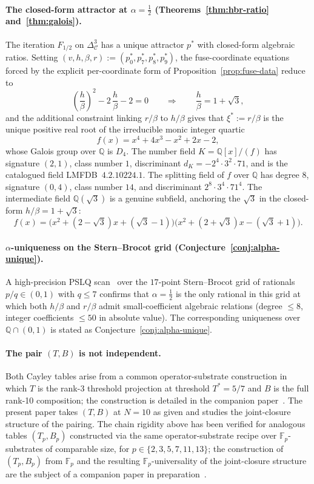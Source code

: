 \documentclass[11pt,reqno]{amsart}
\theoremstyle{plain}
\theoremstyle{definition}
\theoremstyle{remark}
\newcommand{\Q}{\mathbb{Q}}
\newcommand{\F}{\mathbb{F}}
\newcommand{\Cfour}{\mathcal{C}}
\begin{document}
\paragraph{The closed-form attractor at $\alpha = \tfrac{1}{2}$
(Theorems~\ref{thm:hbr-ratio} and~\ref{thm:galois}).}
The iteration $F_{1/2}$ on $\Delta^{3}_{\Cfour}$ has a unique
attractor $p^*$ with closed-form algebraic ratios. Setting
$(v, h, \beta, r) := (p^*_{0}, p^*_{7}, p^*_{8}, p^*_{9})$, the
fuse-coordinate equations forced by the explicit per-coordinate
form of Proposition~\ref{prop:fuse-data} reduce to
\[
  \left(\frac{h}{\beta}\right)^{2} - 2\,\frac{h}{\beta} - 2 = 0
  \qquad\Longrightarrow\qquad \frac{h}{\beta} = 1 + \sqrt{3},
\]
and the additional constraint linking $r/\beta$ to $h/\beta$
gives that $\xi^* := r/\beta$ is the unique positive real root of
the irreducible monic integer quartic
\[
  f(x) = x^{4} + 4x^{3} - x^{2} + 2x - 2,
\]
whose Galois group over $\Q$ is $D_{4}$. The number field
$K = \Q[x]/(f)$ has signature $(2, 1)$, class number $1$,
discriminant $d_{K} = -2^{4}\cdot 3^{2}\cdot 71$, and is the
catalogued field LMFDB~$4.2.10224.1$. The splitting field of $f$
over $\Q$ has degree $8$, signature $(0, 4)$, class number $14$,
and discriminant $2^{8}\cdot 3^{4}\cdot 71^{4}$. The intermediate
field $\Q(\sqrt{3})$ is a genuine subfield, anchoring the
$\sqrt{3}$ in the closed-form $h/\beta = 1+\sqrt{3}$:
\[
  f(x) = \bigl(x^{2}+(2-\sqrt{3})x+(\sqrt{3}-1)\bigr)
         \bigl(x^{2}+(2+\sqrt{3})x-(\sqrt{3}+1)\bigr).
\]

\paragraph{$\alpha$-uniqueness on the Stern--Brocot grid
(Conjecture~\ref{conj:alpha-unique}).} A high-precision PSLQ
scan~\cite{FergusonBailey1999} over the $17$-point Stern--Brocot
grid of rationals $p/q\in(0,1)$ with $q\le 7$ confirms that
$\alpha=\tfrac12$ is the only rational in this grid at which both
$h/\beta$ and $r/\beta$ admit small-coefficient algebraic
relations (degree $\le 8$, integer coefficients $\le 50$ in
absolute value). The corresponding uniqueness over
$\Q\cap(0,1)$ is stated as Conjecture~\ref{conj:alpha-unique}.

\paragraph{The pair $(T,B)$ is not independent.} Both Cayley
tables arise from a common operator-substrate construction in
which $T$ is the rank-3 threshold projection at threshold
$T^{*} = 5/7$ and $B$ is the full rank-10 composition; the
construction is detailed in the companion
paper~\cite{SandersGish2026Sigma}. The present paper takes
$(T, B)$ at $N = 10$ as given and studies the joint-closure
structure of the pairing. The chain rigidity above has been
verified for analogous tables $(T_{p}, B_{p})$ constructed via
the same operator-substrate recipe over $\F_{p}$-substrates of
comparable size, for $p \in \{2, 3, 5, 7, 11, 13\}$; the
construction of $(T_{p}, B_{p})$ from $\F_{p}$ and the resulting
$\F_{p}$-universality of the joint-closure structure are the
subject of a companion paper in
preparation~\cite{SandersClaudeChat2026BridgeSprint}.
\end{document}

